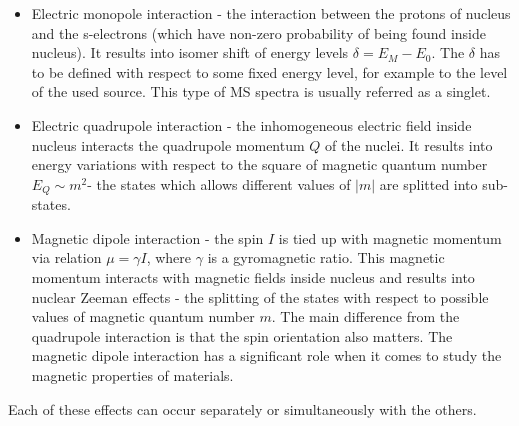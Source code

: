\begin{itemize}
\item Electric monopole interaction - the interaction between the protons of nucleus and the s-electrons (which have non-zero probability of being found inside nucleus). It results into isomer shift of energy levels $\delta = E_M - E_0$. The $\delta$ has to be defined with respect to some fixed energy level, for example to the level of the used source. This type of MS spectra is usually referred as a singlet. 
\item Electric quadrupole interaction - the inhomogeneous electric field inside nucleus interacts the quadrupole momentum $Q$ of the nuclei. It results into energy variations with respect to the square of magnetic quantum number $E_Q \sim m^{2}$- the states which allows different values of $|m|$ are splitted into sub-states.

\item Magnetic dipole interaction - the spin $I$ is tied up with magnetic momentum via relation $\mu = \gamma I$, where $\gamma$ is a gyromagnetic ratio. This magnetic momentum interacts with magnetic fields inside nucleus and results into nuclear Zeeman effects - the splitting of the states with respect to possible values of magnetic quantum number $m$. The main difference from the quadrupole interaction is that the spin orientation also matters. The magnetic dipole interaction has a significant role when it comes to study the magnetic properties of materials.
\end{itemize}

Each of these effects can occur separately or simultaneously with the others.





